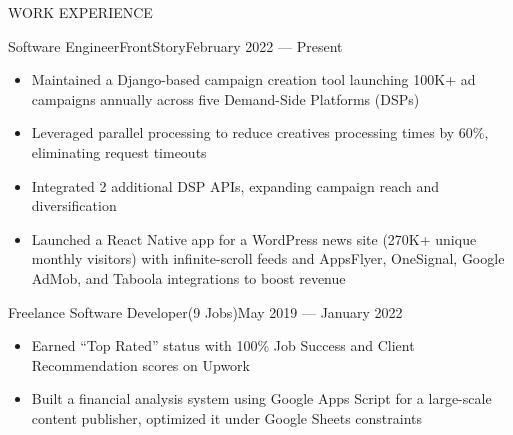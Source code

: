 \documentclass[]{mcdowellcv}
\begin{document}
	\makeheader
	
	
	\begin{cvsection}{WORK EXPERIENCE}
		\begin{cvsubsection}{Software Engineer}{FrontStory}{February 2022 — Present}
			\begin{itemize}
				\item Maintained a Django-based campaign creation tool launching 100K+ ad campaigns annually across five Demand-Side Platforms (DSPs)
				\item Leveraged parallel processing to reduce creatives processing times by 60\%, eliminating request timeouts
				\item Integrated 2 additional DSP APIs, expanding campaign reach and diversification
				\item Launched a React Native app for a WordPress news site (270K+ unique monthly visitors) with infinite-scroll feeds and AppsFlyer, OneSignal, Google AdMob, and Taboola integrations to boost revenue
			\end{itemize}
		\end{cvsubsection}
		\begin{cvsubsection}{Freelance Software Developer}{(9 Jobs)}{May 2019 — January 2022}
			\begin{itemize}
				\item Earned “Top Rated” status with 100\% Job Success and Client Recommendation scores on Upwork
				\item Built a financial analysis system using Google Apps Script for a large-scale content publisher, optimized it under Google Sheets constraints
			\end{itemize}
		\end{cvsubsection}
	\end{cvsection}
	
\end{document}
